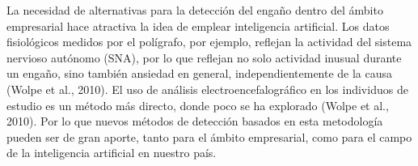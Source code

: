 La necesidad de alternativas para la detección del engaño dentro del ámbito empresarial hace atractiva la idea de emplear inteligencia artificial. Los datos fisiológicos medidos por el polígrafo, por ejemplo, reflejan la actividad del sistema nervioso autónomo (SNA), por lo que reflejan no solo actividad inusual durante un engaño, sino también ansiedad en general, independientemente de la causa (Wolpe et al., 2010). El uso de análisis electroencefalográfico en los individuos de estudio es un método más directo, donde poco se ha explorado (Wolpe et al., 2010). Por lo que nuevos métodos de detección basados en esta metodología pueden ser de gran aporte, tanto para el ámbito empresarial, como para el campo de la inteligencia artificial en nuestro país.   